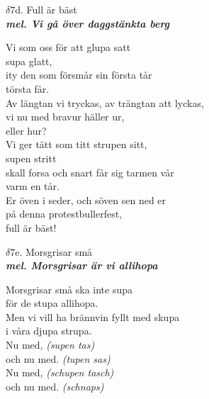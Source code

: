 \documentclass[a6paper,10pt]{article}
\newcommand{\mel}[1]{\small\textbf{\textit{mel. #1 \\}}}
\begin{document}
\newpage
\setlength{\oddsidemargin}{-0.37in}
\noindent
\begin{center}
\Large $\delta7$d. Full är bäst\\ 
\mel{Vi gå över daggstänkta berg}
\end{center}
Vi som oss för att glupa satt \\
supa glatt, \\
ity den som försmår sin första tår \\
törsta får. \\
Av längtan vi tryckas, av trängtan att lyckas, \\
vi nu med bravur häller ur,
\\eller hur? 
\vspace{5pt} \\
Vi ger tätt som titt strupen sitt, \\
supen stritt \\
skall forsa och snart får sig tarmen vår \\
varm en tår. \\
Er öven i seder, och söven sen ned er\\ 
på denna protestbullerfest, \\
full är bäst! 
\begin{center}
\Large $\delta7$e. Morsgrisar små\\ 
\mel{Morsgrisar är vi allihopa}
\end{center}
Morsgrisar små ska inte supa \\
för de stupa allihopa. \\
Men vi vill ha brännvin fyllt med skupa \\
i våra djupa strupa. 
\vspace{5pt} \\
Nu med, \textit{(supen tas) }\\
och nu med. \textit{(tupen sas) }\\
Nu med, \textit{(schupen tasch) }\\
och nu med. \textit{(schnaps) }
\end{document}
